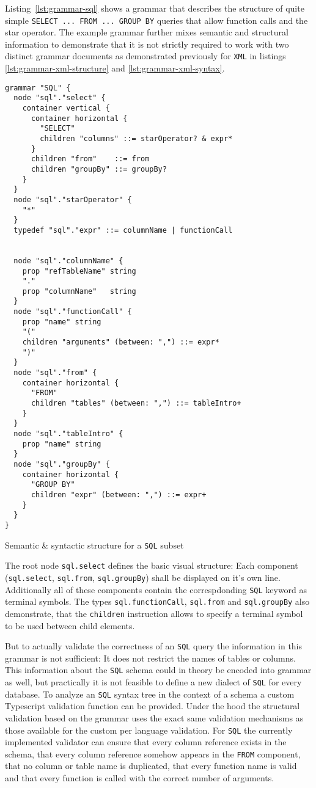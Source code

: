 \documentclass[sigconf,natbib=false,review=true,anonymous]{acmart}
\newenvironment{longlisting}{\captionsetup{type=listing} \vspace{1.5em}}{\vspace{1.5em}}
\begin{document}
Listing~\ref{lst:grammar-sql} shows a grammar that describes the structure of quite simple \texttt{SELECT ... FROM ... GROUP BY} queries that allow function calls and the star operator. The example grammar further mixes semantic and structural information to demonstrate that it is not strictly required to work with two distinct grammar documents as demonstrated previously for \texttt{XML} in listings \ref{lst:grammar-xml-structure} and \ref{lst:grammar-xml-syntax}.

\begin{longlisting}
\begin{verbatim}
grammar "SQL" {
  node "sql"."select" {
    container vertical {
      container horizontal {
        "SELECT"
        children "columns" ::= starOperator? & expr*
      }
      children "from"    ::= from
      children "groupBy" ::= groupBy?
    }
  }
  node "sql"."starOperator" {
    "*"
  }
  typedef "sql"."expr" ::= columnName | functionCall


  node "sql"."columnName" {
    prop "refTableName" string
    "."
    prop "columnName"   string
  }
  node "sql"."functionCall" {
    prop "name" string
    "("
    children "arguments" (between: ",") ::= expr*
    ")"
  }
  node "sql"."from" {
    container horizontal {
      "FROM"
      children "tables" (between: ",") ::= tableIntro+
    }
  }
  node "sql"."tableIntro" {
    prop "name" string
  }
  node "sql"."groupBy" {
    container horizontal {
      "GROUP BY"
      children "expr" (between: ",") ::= expr+
    }
  }
}
\end{verbatim}
\caption{Semantic \& syntactic structure for a \texttt{SQL} subset}
\label{lst:grammar-sql}
\end{longlisting}

The root node \texttt{sql.select} defines the basic visual structure: Each component (\texttt{sql.select}, \texttt{sql.from}, \texttt{sql.groupBy}) shall be displayed on it's own line. Additionally all of these components contain the correspdonding \texttt{SQL} keyword as terminal symbols. The types \texttt{sql.functionCall}, \texttt{sql.from} and \texttt{sql.groupBy} also demonstrate, that the \texttt{children} instruction allows to specify a terminal symbol to be used between child elements.

But to actually validate the correctness of an \texttt{SQL} query the information in this grammar is not sufficient: It does not restrict the names of tables or columns. This information about the \texttt{SQL} schema could in theory be encoded into grammar as well, but practically it is not feasible to define a new dialect of \texttt{SQL} for every database. To analyze an \texttt{SQL} syntax tree in the context of a schema a custom Typescript validation function can be provided. Under the hood the structural validation based on the grammar uses the exact same validation mechanisms as those available for the custom per language validation. For \texttt{SQL} the currently implemented validator can ensure that every column reference exists in the schema, that every column reference somehow appears in the \texttt{FROM} component, that no column or table name is duplicated, that every function name is valid and that every function is called with the correct number of arguments.
\end{document}

